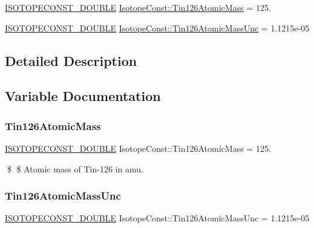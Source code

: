 \begin{DoxyCompactItemize}
\item 
\mbox{\hyperlink{group___isotope_const-_macros_ga8f45a7272ce02c0b4c65c44636ed719a}{I\+S\+O\+T\+O\+P\+E\+C\+O\+N\+S\+T\+\_\+\+D\+O\+U\+B\+LE}} \mbox{\hyperlink{group___isotope_const-_tin-_sn126_ga2caccf244c6437d5ba112864d2874061}{Isotope\+Const\+::\+Tin126\+Atomic\+Mass}} = 125.
\item 
\mbox{\hyperlink{group___isotope_const-_macros_ga8f45a7272ce02c0b4c65c44636ed719a}{I\+S\+O\+T\+O\+P\+E\+C\+O\+N\+S\+T\+\_\+\+D\+O\+U\+B\+LE}} \mbox{\hyperlink{group___isotope_const-_tin-_sn126_gae43e3e499128dda7f7c272ac445f4ed4}{Isotope\+Const\+::\+Tin126\+Atomic\+Mass\+Unc}} = 1.\+1215e-\/05
\end{DoxyCompactItemize}


\subsection{Detailed Description}


\subsection{Variable Documentation}
\mbox{\label{group___isotope_const-_tin-_sn126_ga2caccf244c6437d5ba112864d2874061}} 
\subsubsection{\texorpdfstring{Tin126\+Atomic\+Mass}{Tin126AtomicMass}}
{\footnotesize\ttfamily \mbox{\hyperlink{group___isotope_const-_macros_ga8f45a7272ce02c0b4c65c44636ed719a}{I\+S\+O\+T\+O\+P\+E\+C\+O\+N\+S\+T\+\_\+\+D\+O\+U\+B\+LE}} Isotope\+Const\+::\+Tin126\+Atomic\+Mass = 125.}

\$ \$ Atomic mass of Tin-\/126 in amu. \mbox{\label{group___isotope_const-_tin-_sn126_gae43e3e499128dda7f7c272ac445f4ed4}} 
\subsubsection{\texorpdfstring{Tin126\+Atomic\+Mass\+Unc}{Tin126AtomicMassUnc}}
{\footnotesize\ttfamily \mbox{\hyperlink{group___isotope_const-_macros_ga8f45a7272ce02c0b4c65c44636ed719a}{I\+S\+O\+T\+O\+P\+E\+C\+O\+N\+S\+T\+\_\+\+D\+O\+U\+B\+LE}} Isotope\+Const\+::\+Tin126\+Atomic\+Mass\+Unc = 1.\+1215e-\/05}


